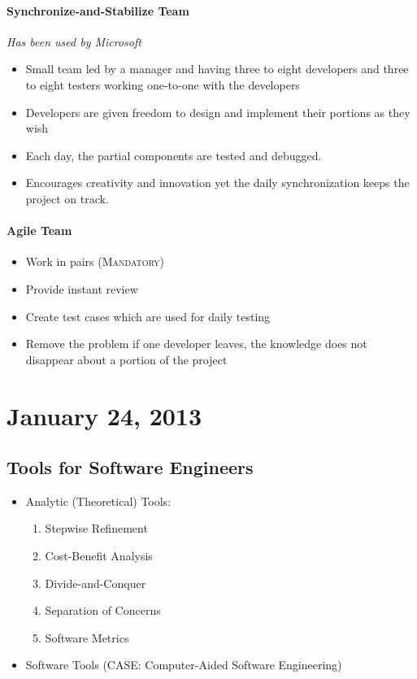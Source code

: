 \documentclass{report}
\begin{document}
				\subsubsection{Synchronize-and-Stabilize Team}
					\textit{Has been used by Microsoft}
					\begin{itemize}
						\item Small team led by a manager and having three to eight developers and three to eight testers working one-to-one with the developers
						\item Developers are given freedom to design and implement their portions as they wish
						\item Each day, the partial components are tested and debugged.
						\item Encourages creativity and innovation yet the daily synchronization keeps the project on track.
					\end{itemize}
				\subsubsection{Agile Team}
					\begin{itemize}
						\item Work in pairs (\textsc{Mandatory})
						\item Provide instant review
						\item Create test cases which are used for daily testing
						\item Remove the problem if one developer leaves, the knowledge does not disappear about a portion of the project
					\end{itemize}
	\chapter{January 24, 2013}
		\section{Tools for Software Engineers} 
			\begin{itemize}
				\item  Analytic (Theoretical) Tools:
					\begin{enumerate}
						\item  Stepwise Refinement
						\item Cost-Benefit Analysis
						\item Divide-and-Conquer
						\item Separation of Concerns
						\item Software Metrics
					\end{enumerate}
				\item Software Tools (CASE: Computer-Aided Software Engineering)
			\end{itemize}
\end{document}
